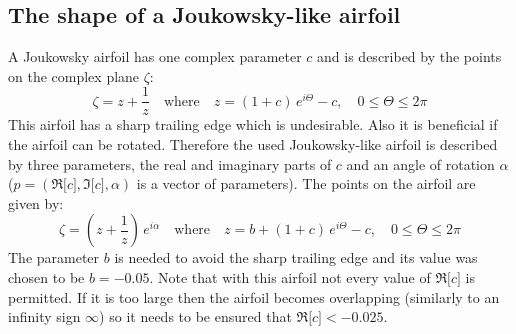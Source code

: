 \documentclass[12pt, a4paper]{article}
\begin{document}
    \subsection{The shape of a Joukowsky-like airfoil}
        A Joukowsky airfoil has one complex parameter $c$ and is described by the points on the complex plane $\zeta$:
        \begin{equation}
            \zeta = z + \frac{1}{z} \quad \text{where} \quad 
            z = (1+c) \, e^{i \Theta} - c , \quad
            0 \leq \Theta \leq 2 \pi
        \end{equation}
        This airfoil has a sharp trailing edge which is undesirable. Also it is beneficial if the airfoil can be rotated. Therefore the used Joukowsky-like airfoil is described by three parameters, the real and imaginary parts of $c$ and an angle of rotation $\alpha$ ($p = (\Re \lbrack c \rbrack, \Im \lbrack c \rbrack, \alpha)$ is a vector of parameters). The points on the airfoil are given by:
        \begin{equation}
            \zeta = \left( z + \frac{1}{z} \right) \, e^{i \alpha} \quad \text{where} \quad 
            z = b + (1+c) \, e^{i \Theta} - c , \quad
            0 \leq \Theta \leq 2 \pi
        \end{equation}
        The parameter $b$ is needed to avoid the sharp trailing edge and its value was chosen to be $b = -0.05$. Note that with this airfoil not every value of $\Re \lbrack c \rbrack$ is permitted. If it is too large then the airfoil becomes overlapping (similarly to an infinity sign $\infty$) so it needs to be ensured that $\Re \lbrack c \rbrack < -0.025$.
        
\end{document}
